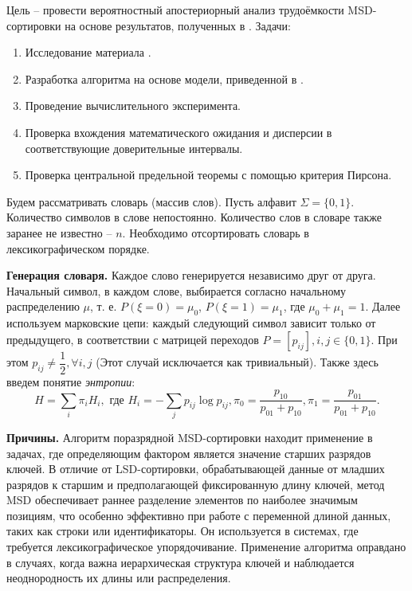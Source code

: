 \documentclass[a4paper, 12pt]{article}
\begin{document}
Цель -- провести вероятностный апостериорный анализ трудоёмкости MSD-сортировки на основе результатов, полученных в \cite{limitth}. Задачи:
\begin{enumerate}
	\item Исследование материала \cite{limitth}.
	\item Разработка алгоритма на основе модели, приведенной в \cite{limitth}.
	\item Проведение вычислительного эксперимента.
	\item Проверка вхождения математического ожидания и дисперсии в соответствующие доверительные интервалы.
	\item Проверка центральной предельной теоремы с помощью критерия Пирсона.
\end{enumerate}

\newpage
{}
Будем рассматривать словарь (массив слов). Пусть алфавит $\Sigma = \{0, 1\}$. Количество символов в слове непостоянно. Количество слов в словаре также заранее не известно -- $n$. Необходимо отсортировать словарь в лексикографическом порядке.

\textbf{Генерация словаря.} Каждое слово генерируется независимо друг от друга. Начальный символ, в каждом слове, выбирается согласно начальному распределению $\mu$, т. е. $P(\xi = 0) = \mu_0$, $P(\xi = 1) = \mu_1$, где $\mu_0+\mu_1=1$. Далее используем марковские цепи: каждый следующий символ зависит только от предыдущего, в соответствии с матрицей переходов $P = [p_{ij}], i, j \in \{0, 1\}$. При этом $p_{ij}\neq \dfrac{1}{2}, \forall i, j$ (Этот случай исключается как тривиальный). Также здесь введем понятие \textit{энтропии}:
\begin{equation}
	H = \sum_i\pi_iH_i, \text{ где } H_i = - \sum_jp_{ij}\log p_{ij}, \pi_0=\dfrac{p_{10}}{p_{01}+p_{10}}, \pi_1 = \dfrac{p_{01}}{p_{01}+p_{10}}. \label{eq:H}
\end{equation}

\textbf{Причины.} Алгоритм поразрядной MSD-сортировки находит применение в задачах, где определяющим фактором является значение старших разрядов ключей. В отличие от LSD-сортировки, обрабатывающей данные от младших разрядов к старшим и предполагающей фиксированную длину ключей, метод MSD обеспечивает раннее разделение элементов по наиболее значимым позициям, что особенно эффективно при работе с переменной длиной данных, таких как строки или идентификаторы. Он используется в системах, где требуется лексикографическое упорядочивание. Применение алгоритма оправдано в случаях, когда важна иерархическая структура ключей и наблюдается неоднородность их длины или распределения.
\end{document}
